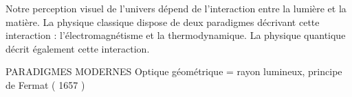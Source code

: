 Notre perception visuel de l'univers dépend de l'interaction entre la lumière et la matière.
La physique classique dispose de deux paradigmes décrivant cette interaction : l'électromagnétisme et la thermodynamique.
La physique quantique décrit également cette interaction.






\begin{comment}
\end{comment}

PARADIGMES MODERNES
	Optique géométrique = rayon lumineux, principe de Fermat ( 1657 )

